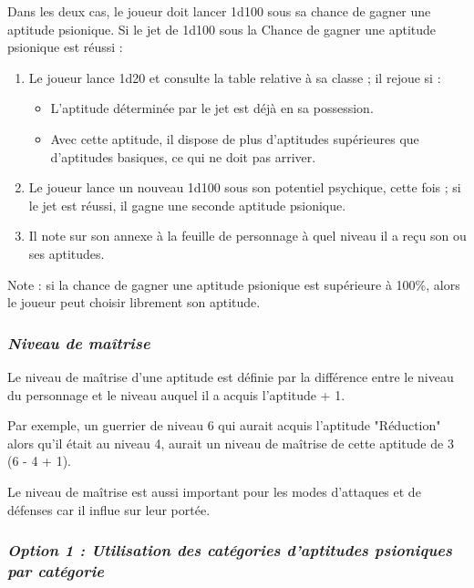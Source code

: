 \bigskip

Dans les deux cas, le joueur doit lancer 1d100 sous sa chance de gagner une aptitude psionique. Si le jet de 1d100 sous la Chance de gagner une aptitude psionique est réussi :

\bigskip

\begin{enumerate}
\item Le joueur lance 1d20 et consulte la table relative à sa classe ; il rejoue si :
\begin{itemize}
\item L'aptitude déterminée par le jet est déjà en sa possession.
\item Avec cette aptitude, il dispose de plus d'aptitudes supérieures que d'aptitudes basiques, ce qui ne doit pas arriver.
\end{itemize}
\item Le joueur lance un nouveau 1d100 sous son potentiel psychique, cette fois ; si le jet est réussi, il gagne une seconde aptitude psionique.
\item Il note sur son annexe à la feuille de personnage à quel niveau il a reçu son ou ses aptitudes. \end{enumerate}

\bigskip

Note : si la chance de gagner une aptitude psionique est supérieure à 100\%, alors le joueur peut choisir librement son aptitude.

\subsubsection*{\textit{Niveau de maîtrise}}

Le niveau de maîtrise d'une aptitude est définie par la différence entre le niveau du personnage et le niveau auquel il a acquis l'aptitude + 1.

\bigskip

Par exemple, un guerrier de niveau  6 qui aurait acquis l'aptitude "Réduction" alors qu'il était au niveau 4, aurait un niveau de maîtrise de cette aptitude de 3 (6 - 4 + 1).

\bigskip

Le niveau de maîtrise est aussi important pour les modes d'attaques et de défenses car il influe sur leur portée.


\subsubsection*{\textit{Option 1 : Utilisation des catégories d'aptitudes psioniques par catégorie}}

